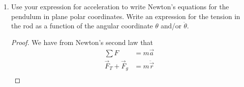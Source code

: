 \documentclass[../psets.tex]{subfiles}
\begin{document}
\begin{enumerate}
\begin{enumerate}
\begin{proof}
            \begin{align*}
                \hat{r} &= (\cos\theta)\hat{x}+(\sin\theta)\hat{y}&
                \hat{\theta} &= (-\sin\theta)\hat{x}+(\cos\theta)\hat{y}
            \end{align*}
            Differentiating yields the desired result, as follows.
            \begin{align*}
                \pdv{\hat{r}}{\theta} &= (-\sin\theta)\hat{x}+(\cos\theta)\hat{y} = \hat{\theta}&
                \pdv{\hat{\theta}}{\theta} &= (-\cos\theta)\hat{x}+(-\sin\theta)\hat{y} = -\hat{r}
            \end{align*}
            Moving onto the second part of the problem, note that $r$ is naturally a function of time but $\hat{r}$ is also a function of time through its dependence on $\theta$. Thus,
            \begin{align*}
                \ddot{\vec{r}} &= \dv[2]{t}(r\hat{r})\\
                &= \dv{t}(\dot{r}\hat{r}+r\dv{\hat{r}}{t})\\
                &= \dv{t}(\dot{r}\hat{r}+r\dv{\hat{r}}{\theta}\dv{\theta}{t})\\
                &= \dv{t}(\dot{r}\hat{r}+r\dot{\theta}\hat{\theta})\\
                &= \ddot{r}\hat{r}+\dot{r}\dv{\hat{r}}{t}+\dot{r}\dot{\theta}\hat{\theta}+r\ddot{\theta}\hat{\theta}+r\dot{\theta}\dv{\hat{\theta}}{t}\\
                &= \ddot{r}\hat{r}+\dot{r}\dot{\theta}\hat{\theta}+\dot{r}\dot{\theta}\hat{\theta}+r\ddot{\theta}\hat{\theta}-r\dot{\theta}^2\hat{r}\\
                \Aboxed{\ddot{\vec{r}} &= (\ddot{r}-r\dot{\theta}^2)\hat{r}+(r\ddot{\theta}+2\dot{r}\dot{\theta})\hat{\theta}}
            \end{align*}
        \end{proof}
        \item Use your expression for acceleration to write Newton's equations for the pendulum in plane polar coordinates. Write an expression for the tension in the rod as a function of the angular coordinate $\theta$ and/or $\dot{\theta}$.
        \begin{proof}
            We have from Newton's second law that
            \begin{align*}
                \sum F &= m\vec{a}\\
                \vec{F}_T+\vec{F}_g &= m\ddot{\vec{r}}\\

\end{align*}
\end{proof}
\end{enumerate}
\end{enumerate}
\end{document}
